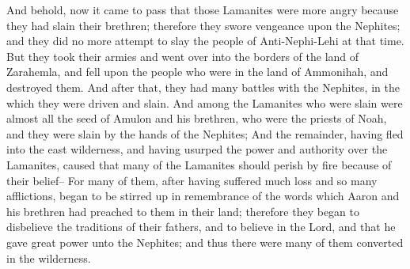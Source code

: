 And behold, now it came to pass that those Lamanites were more angry because they had slain their brethren; therefore they swore vengeance upon the Nephites; and they did no more attempt to slay the people of Anti-Nephi-Lehi at that time.
\bverse \iffalse But they took their armies and went over into the borders of the land of Zarahemla, and fell upon the people who were in the land of Ammonihah, and destroyed them. \fi
But they took their armies and went over into the borders of the land of Zarahemla, and fell upon the people who were in the land of Ammonihah, and destroyed them.
\bverse \iffalse And after that, they had many battles with the Nephites, in the which they were driven and slain. \fi
And after that, they had many battles with the Nephites, in the which they were driven and slain.
\bverse \iffalse And among the Lamanites who were slain were almost all the seed of Amulon and his brethren, who were the priests of Noah, and they were slain by the hands of the Nephites; \fi
And among the Lamanites who were slain were almost all the seed of Amulon and his brethren, who were the priests of Noah, and they were slain by the hands of the Nephites;
\bverse \iffalse And the remainder, having fled into the east wilderness, and having usurped the power and authority over the Lamanites, caused that many of the Lamanites should perish by fire because of their belief-- \fi
And the remainder, having fled into the east wilderness, and having usurped the power and authority over the Lamanites, caused that many of the Lamanites should perish by fire because of their belief--
\bverse \iffalse For many of them, after having suffered much loss and so many afflictions, began to be stirred up in remembrance of the words which Aaron and his brethren had preached to them in their land; therefore they began to disbelieve the traditions of their fathers, and to believe in the Lord, and that he gave great power unto the Nephites; and thus there were many of them converted in the wilderness. \fi
For many of them, after having suffered much loss and so many afflictions, began to be stirred up in remembrance of the words which Aaron and his brethren had preached to them in their land; therefore they began to disbelieve the traditions of their fathers, and to believe in the Lord, and that he gave great power unto the Nephites; and thus there were many of them converted in the wilderness.
\bverse \iffalse And it came to pass that those rulers who were the remnant of the children of Amulon caused that they should be put to death, yea, all those that believed in these things. \fi
